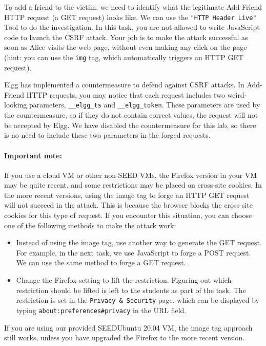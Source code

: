 To add a friend to the victim, we need to identify what the legitimate 
Add-Friend HTTP request (a GET request) looks like. We can use 
the \texttt{"HTTP Header Live"} Tool to do the investigation. 
In this task, you are not allowed to
write JavaScript code to launch the CSRF attack. Your job is to make the
attack successful as soon as Alice visits the web page, without even making
any click on the page (hint: you can use the {\tt img} tag, which
automatically triggers an HTTP GET request).
 

Elgg has implemented a countermeasure to defend against 
CSRF attacks. In Add-Friend HTTP requests, you may notice that each 
request includes two weird-looking parameters, \texttt{\_\_elgg\_ts} and 
\texttt{\_\_elgg\_token}. These parameters are used by the countermeasure, so if they do not
contain correct values, the request will not be accepted by Elgg.   
We have disabled the countermeasure for this lab, so there is no need to include these two 
parameters in the forged requests. 


\paragraph{Important note:} If you use a cloud VM or other non-SEED VMs, 
the Firefox version in your VM may be quite recent, and some restrictions
may be placed on cross-site cookies. 
In the more recent versions, using the image tag to forge an HTTP GET request will not 
succeed in the attack. This is because the browser blocks the cross-site cookies 
for this type of request. If you encounter this situation, you can choose
one of the following methods to make the attack work:

\begin{itemize}
\item Instead of using the image tag, use another way to generate the GET request.
For example, in the next task, we use JavaScript to forge a POST request.
We can use the same method to forge a GET request. 

\item Change the Firefox setting to lift the restriction. Figuring out which
restriction should be lifted is left to the students as part of the task. 
The restriction is set in the \texttt{Privacy \& Security} page, which
can be displayed by typing \texttt{about:preferences\#privacy} in the URL field. 
\end{itemize}
 
If you are using our provided SEEDUbuntu 20.04 VM, the image tag approach still works, 
unless you have upgraded the Firefox to the more recent version. 

